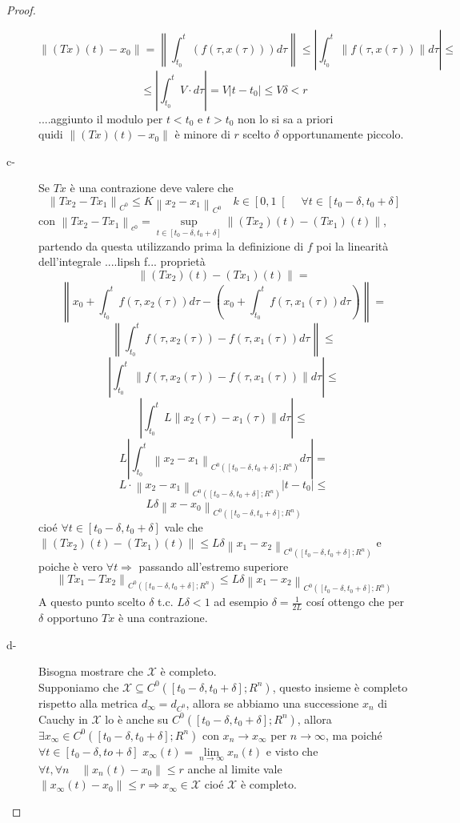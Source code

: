 \begin{proof}
\begin{description}
		$$\left\|(Tx)(t) - x_0 \right\| = \left\| \int_{t_0}^t(f(\tau,x(\tau)))d\tau \right\| \le \left|\int_{t_0}^t \left\| f(\tau,x(\tau)) \right\|d\tau \right|\le$$
		$$\le\left| \int_{t_0}^t V\cdot d\tau\right|=V\left| t-t_0\right|\le V\delta<r$$
		....aggiunto il modulo per $t<t_0$ e $t>t_0$ non lo si sa a priori\\
		quidi $\left\|(Tx)(t) - x_0 \right\|$ è minore di $r$ scelto $\delta$ opportunamente piccolo. 
		\item[c-] Se $Tx$ è una contrazione deve valere che
		$$\left\| Tx_2 - Tx_1\right\|_{C^0}\le K\left\|x_2-x_1\right\|_{C^0}\quad k\in\left[0,1\right[\quad\forall t\in\left[t_0-\delta,t_0+\delta\right]$$
		con $\left\|Tx_2-Tx_1\right\|_{c^0}=\sup\limits_{t\in\left[t_0-\delta,t_0+\delta\right]}\left\| (Tx_2)(t) - (Tx_1)(t)\right\|$, partendo da questa utilizzando prima la definizione di $f$ poi la linearità dell'integrale ....lipsh f... proprietà
		$$\left\| (Tx_2)(t) - (Tx_1)(t)\right\|=$$
		$$\left\| x_0+\int_{t_0}^t f(\tau,x_2(\tau)) d\tau - \left(x_0+\int_{t_0}^t f(\tau,x_1(\tau)) d\tau\right) \right\|=$$
		$$\left\| \int_{t_0}^t f(\tau,x_2(\tau))-f(\tau,x_1(\tau)) d\tau \right\|\le$$
		$$\left| \int_{t_0}^t \left\|f(\tau,x_2(\tau))-f(\tau,x_1(\tau))\right\| d\tau \right|\le$$
		$$\left| \int_{t_0}^t L\left\|x_2(\tau)-x_1(\tau)\right\| d\tau \right|\le$$
		$$L\left| \int_{t_0}^t \left\|x_2-x_1\right\|_{C^0(\left[t_0-\delta,t_0+\delta\right];R^n)} d\tau \right|=$$
		$$L\cdot \left\| x_2-x_1 \right\|_{C^0(\left[t_0-\delta,t_0+\delta\right];R^n)}\left|t-t_0\right|\le$$
		$$L\delta\left\|x-x_0\right\|_{C^0(\left[t_0-\delta,t_0+\delta\right];R^n)}$$
		cio\'e $\forall t \in \left[t_0-\delta,t_0+\delta\right]$ vale che $\left\|(Tx_2)(t)-(Tx_1)(t)\right\|\le L\delta\left\|x_1-x_2\right\|_{C^0(\left[t_0-\delta,t_0+\delta\right];R^n)}$ e poiche è vero $\forall t \Rightarrow $ passando all'estremo superiore
		$$ \left\| Tx_1 - Tx_2 \right\|_{C^0(\left[t_0-\delta,t_0+\delta\right];R^n)}\le L\delta\left\|x_1-x_2\right\|_{C^0(\left[t_0-\delta,t_0+\delta\right];R^n)}$$
		A questo punto scelto $\delta$ t.c. $L\delta<1$ ad esempio $\delta=\frac{1}{2L}$ cos\'i ottengo che per $\delta$ opportuno $Tx$ è una contrazione.		
		\item[d-] Bisogna mostrare che $\mathcal{X}$ è completo.\\
		Supponiamo che $\mathcal{X}\subseteq C^0(\left[t_0-\delta,t_0+\delta\right];R^n)$, questo insieme è completo rispetto alla metrica $d_\infty=d_{C^0}$, allora se abbiamo una successione $x_n$ di Cauchy in $\mathcal{X}$ lo è anche su $C^0(\left[t_0-\delta,t_0+\delta\right];R^n)$, allora $\exists x_\infty\in C^0(\left[t_0-\delta,t_0+\delta\right];R^n)$ con $x_n\to x_\infty$ per $n\to\infty$, ma poiché $\forall t \in\left[t_0-\delta,to+\delta\right]$ $x_\infty(t)=\lim\limits_{n\to\infty}x_n(t)$ e visto che $\forall t,\forall n\quad \left\| x_n(t)-x_0\right\|\le r$ anche al limite vale $\left\| x_{\infty}(t)-x_0\right\|\le r \Rightarrow x_\infty\in\mathcal{X}$ cio\'e $\mathcal{X}$ è completo.

\end{description}
\end{proof}
